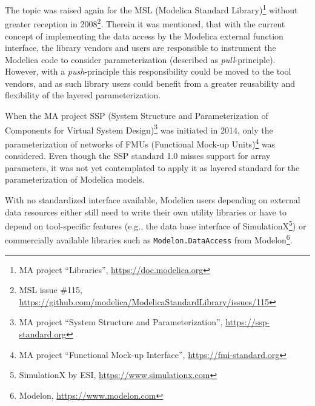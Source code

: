 \documentclass{modelica}
\newcommand{\modelica}[1]{\lstinline[language=modelica]|#1|}
\begin{document}
The topic was raised again for the MSL (Modelica Standard Library)\footnote{MA project ``Libraries'', \url{https://doc.modelica.org}} without greater reception in 2008\footnote{MSL issue \#115, \url{https://github.com/modelica/ModelicaStandardLibrary/issues/115}}. Therein it was mentioned, that with the current concept of implementing the data access by the Modelica external function interface, the library vendors and users are responsible to instrument the Modelica code to consider parameterization (described as \emph{pull}-principle). However, with a \emph{push}-principle this responsibility could be moved to the tool vendors, and as such library users could benefit from a greater reusability and flexibility of the layered parameterization.

When the MA project SSP (System Structure and Parameterization of Components for Virtual System Design)\footnote{MA project ``System Structure and Parameterization'', \url{https://ssp-standard.org}} was initiated in 2014, only the parameterization of networks of FMUs (Functional Mock-up Units)\footnote{MA project ``Functional Mock-up Interface'', \url{https://fmi-standard.org}} was considered. Even though the SSP standard 1.0 misses support for array parameters, it was not yet contemplated to apply it as layered standard for the parameterization of Modelica models.

With no standardized interface available, Modelica users depending on external data resources either still need to write their own utility libraries or have to depend on tool-specific features (e.g., the data base interface of SimulationX\footnote{SimulationX by ESI,
\url{https://www.simulationx.com}}) or commercially available libraries such as \modelica{Modelon.DataAccess} from Modelon\footnote{Modelon, \url{https://www.modelon.com}}.

\medskip
\end{document}
